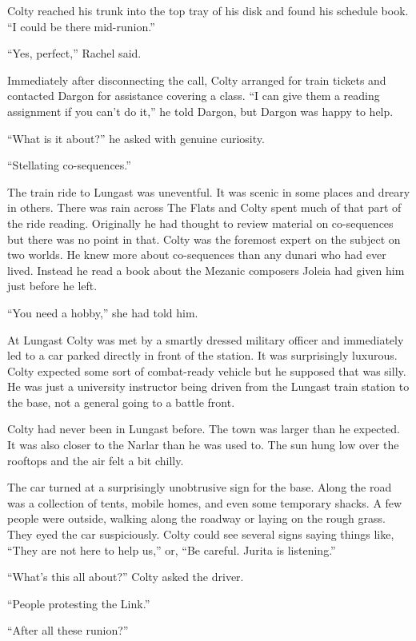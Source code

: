 Colty reached his trunk into the top tray of his disk and found his schedule book. ``I could be
there mid-runion.''

``Yes, perfect,'' Rachel said.

Immediately after disconnecting the call, Colty arranged for train tickets and contacted Dargon
for assistance covering a class. ``I can give them a reading assignment if you can't do it,'' he
told Dargon, but Dargon was happy to help.

``What is it about?'' he asked with genuine curiosity.

``Stellating co-sequences.''

The train ride to Lungast was uneventful. It was scenic in some places and dreary in others.
There was rain across The Flats and Colty spent much of that part of the ride reading.
Originally he had thought to review material on co-sequences but there was no point in that.
Colty was the foremost expert on the subject on two worlds. He knew more about co-sequences than
any dunari who had ever lived. Instead he read a book about the Mezanic composers Joleia had
given him just before he left.

``You need a hobby,'' she had told him.

At Lungast Colty was met by a smartly dressed military officer and immediately led to a car
parked directly in front of the station. It was surprisingly luxurous. Colty expected some sort
of combat-ready vehicle but he supposed that was silly. He was just a university instructor
being driven from the Lungast train station to the base, not a general going to a battle front.

Colty had never been in Lungast before. The town was larger than he expected. It was also closer
to the Narlar than he was used to. The sun hung low over the rooftops and the air felt a bit
chilly.

The car turned at a surprisingly unobtrusive sign for the base. Along the road was a collection
of tents, mobile homes, and even some temporary shacks. A few people were outside, walking along
the roadway or laying on the rough grass. They eyed the car suspiciously. Colty could see
several signs saying things like, ``They are not here to help us,'' or, ``Be careful. Jurita is
listening.''

``What's this all about?'' Colty asked the driver.

``People protesting the Link.''

``After all these runion?''

